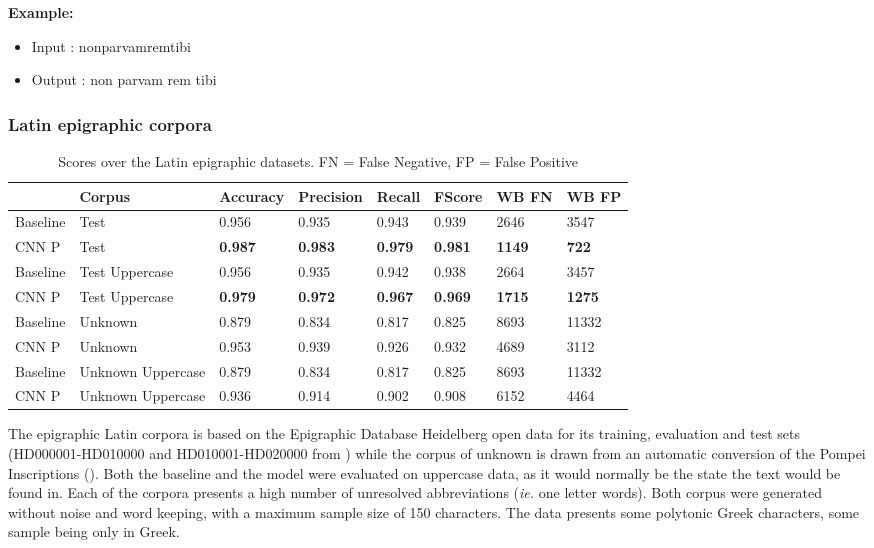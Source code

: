 \documentclass{jdmdh}
\begin{document}
\textbf{Example:}

\begin{itemize}
    \item Input : nonparvamremtibi	
    \item Output : non parvam rem tibi

\end{itemize}

\subsubsection{Latin epigraphic corpora}

\begin{table}[H]
\centering
\begin{tabular}{llllllll}
\hline
 & Corpus & Accuracy & Precision & Recall & FScore & WB FN & WB FP \\ \hline
Baseline & Test & 0.956 & 0.935 & 0.943 & 0.939 & 2646 & 3547 \\
CNN P & Test & \textbf{0.987} & \textbf{0.983} & \textbf{0.979} & \textbf{0.981} & \textbf{1149} & \textbf{722} \\ \hline
Baseline & Test Uppercase & 0.956 & 0.935 & 0.942 & 0.938 & 2664 & 3457 \\
CNN P & Test Uppercase & \textbf{0.979} & \textbf{0.972} & \textbf{0.967} & \textbf{0.969} & \textbf{1715} & \textbf{1275} \\ \hline
Baseline & Unknown & 0.879 & 0.834 & 0.817 & 0.825 & 8693 & 11332 \\
CNN P & Unknown & 0.953 & 0.939 & 0.926 & 0.932 & 4689 & 3112 \\ \hline
Baseline & Unknown Uppercase & 0.879 & 0.834 & 0.817 & 0.825 & 8693 & 11332 \\
CNN P & Unknown Uppercase & 0.936 & 0.914 & 0.902 & 0.908 & 6152 & 4464 \\ \hline
\end{tabular}
\caption{Scores over the Latin epigraphic datasets. FN = False Negative, FP = False Positive}
\label{tab:epigraphyc_latin}
\end{table}


The epigraphic Latin corpora is based on the Epigraphic Database Heidelberg open data \citet{formulae} for its training, evaluation and test sets (HD000001-HD010000 and HD010001-HD020000 from \citet{edh}) while the corpus of unknown is drawn from an automatic conversion of the Pompei Inscriptions (\citet{pompei}). Both the baseline and the model were evaluated on uppercase data, as it would normally be the state the text would be found in. Each of the corpora presents a high number of unresolved abbreviations (\textit{ie.} one letter words). Both corpus were generated without noise and word keeping, with a maximum sample size of 150 characters. The data presents some polytonic Greek characters, some sample being only in Greek.
\end{document}
